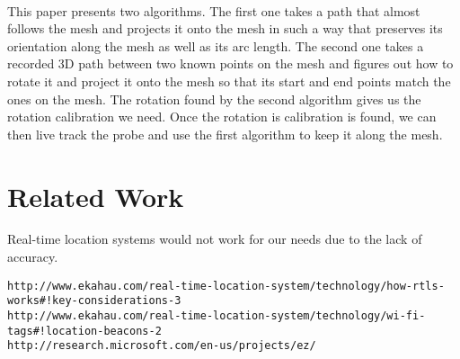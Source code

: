 \documentclass[11pt,psfig]{article}
\begin{document}
\\
This paper presents two algorithms. The first one takes a path that almost follows the mesh and projects it onto the mesh in such a way that preserves its orientation along the mesh as well as its arc length. The second one takes a recorded 3D path between two known points on the mesh and figures out how to rotate it and project it onto the mesh so that its start and end points match the ones on the mesh. The rotation found by the second algorithm gives us the rotation calibration we need. Once the rotation is calibration is found, we can then live track the probe and use the first algorithm to keep it along the mesh. 

\section*{Related Work}

Real-time location systems would not work for our needs due to the lack of accuracy. 
\begin{verbatim}
http://www.ekahau.com/real-time-location-system/technology/how-rtls-works#!key-considerations-3
http://www.ekahau.com/real-time-location-system/technology/wi-fi-tags#!location-beacons-2
http://research.microsoft.com/en-us/projects/ez/
\end{verbatim}
\end{document}
